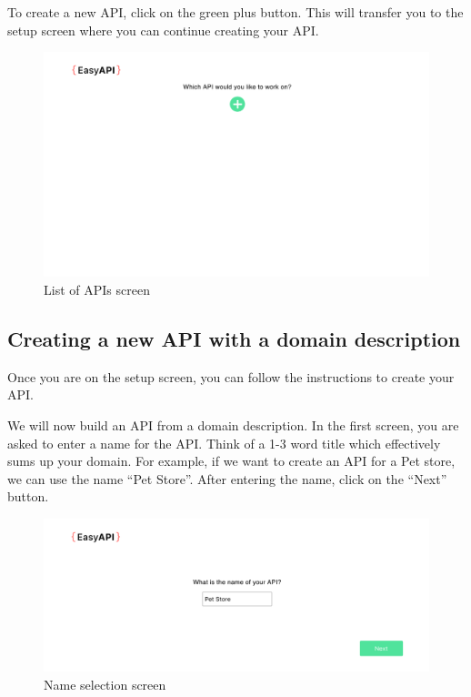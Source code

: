 To create a new API, click on the green plus button. This will transfer you to the setup screen where you can continue creating your API.


\begin{figure}
\label{servicelist}
\centerline{\includegraphics[scale=0.4]{screenshots/servicelist.png}}
\caption{List of APIs screen}
\end{figure}


\subsection{Creating a new API with a domain description}
Once you are on the setup screen, you can follow the instructions to create your API.

We will now build an API from a domain description. In the first screen, you are asked to enter a name for the API. Think of a 1-3 word title which effectively sums up your domain. For example, if we want to create an API for a Pet store, we can use the name ``Pet Store''. After entering the name, click on the ``Next'' button.


\begin{figure}
\label{name}
\centerline{\includegraphics[scale=0.4]{screenshots/name.png}}
\caption{Name selection screen}
\end{figure}



